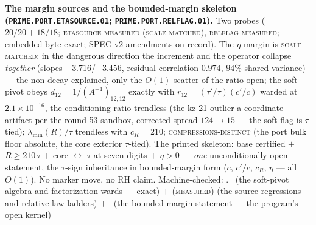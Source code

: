 \par\smallskip\noindent\textbf{The margin sources and the
bounded-margin skeleton
(\texttt{PRIME.PORT.\allowbreak ETASOURCE.01};
\texttt{PRIME.PORT.\allowbreak RELFLAG.01}).}
Two probes ($20/20 + 18/18$; \textsc{etasource-measured
(scale-matched)}, \textsc{relflag-measured}; embedded
byte-exact; SPEC v2 amendments on record).  The $\eta$ margin
is \textsc{scale-matched}: in the dangerous direction the
increment and the operator collapse \emph{together} (slopes
$-3.716$/$-3.456$, residual correlation $0.974$, $94\%$ shared
variance) --- the non-decay explained, only the $O(1)$ scatter
of the ratio open; the soft pivot obeys $d_{12} =
1/(A^{-1})_{12,12}$ exactly with $r_{12} =
(\tau'/\tau)(c'/c)$ warded at $2.1\times10^{-16}$, the
conditioning ratio trendless (the kz-21 outlier a coordinate
artifact per the round-53 sandbox, corrected spread $124 \to
15$ --- the soft flag is $\tau$-tied);
$\lambda_{\min}(R)/\tau$ trendless with $c_R = 210$;
\textsc{compressions-distinct} (the port bulk floor absolute,
the core exterior $\tau$-tied).  The printed skeleton: base
certified $+$ $R \ge 210\,\tau$ $+$ core $\leftrightarrow$
$\tau$ at seven digits $+$ $\eta > 0$ --- \emph{one}
unconditionally open statement, the $\tau$-sign inheritance in
bounded-margin form ($c$, $c'/c$, $c_R$, $\eta$ --- all
$O(1)$).  No marker move, no RH claim.
Machine-checked: .
\mE\ (the soft-pivot algebra and factorization wards ---
exact) $+$ (\textsc{measured}) (the source regressions and
relative-law ladders) $+$ \mO\ (the bounded-margin statement
--- the program's open kernel)
\par\smallskip


